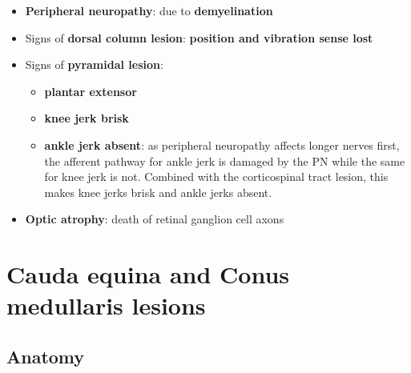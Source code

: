 \documentclass[
  12pt,
]{memoir}
\providecommand{\tightlist}{%
  \setlength{\itemsep}{0pt}\setlength{\parskip}{0pt}}
\begin{document}
\begin{itemize}
\tightlist
\item
  \textbf{Peripheral neuropathy}: due to \textbf{demyelination}
\item
  Signs of \textbf{dorsal column lesion}: \textbf{position and vibration
  sense lost}
\item
  Signs of \textbf{pyramidal lesion}:

  \begin{itemize}
  \tightlist
  \item
    \textbf{plantar extensor}
  \item
    \textbf{knee jerk brisk}
  \item
    \textbf{ankle jerk absent}: as peripheral neuropathy affects longer
    nerves first, the afferent pathway for ankle jerk is damaged by the
    PN while the same for knee jerk is not. Combined with the
    corticospinal tract lesion, this makes knee jerks brisk and ankle
    jerks absent.
  \end{itemize}
\item
  \textbf{Optic atrophy}: death of retinal ganglion cell axons
\end{itemize}

\pagebreak

\hypertarget{cauda-equina-and-conus-medullaris-lesions}{%
\section{Cauda equina and Conus medullaris
lesions}\label{cauda-equina-and-conus-medullaris-lesions}}

\hypertarget{anatomy}{%
\subsection{Anatomy}\label{anatomy}}
\end{document}
